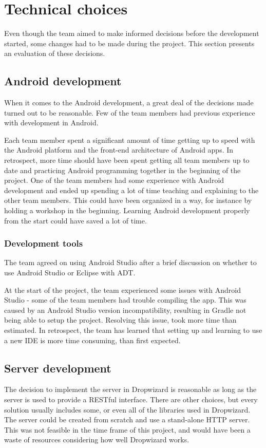 \newpage
\section{Technical choices}
Even though the team aimed to make informed decisions before the development started, some changes had to be made during the project. This section presents an evaluation of these decisions.

\subsection{Android development}
When it comes to the Android development, a great deal of the decisions made turned out to be reasonable. Few of the team members had previous experience with development in Android.

Each team member spent a significant amount of time getting up to speed with the Android platform and the front-end architecture of Android apps. In retrospect, more time should have been spent getting all team members up to date and practicing Android programming together in the beginning of the project. One of the team members had some experience with Android development and ended up spending a lot of time teaching and explaining to the other team members. This could have been organized in a way, for instance by holding a workshop in the beginning. Learning Android development properly from the start could have saved a lot of time.

\subsubsection{Development tools}
The team agreed on using Android Studio after a brief discussion on whether to use Android Studio or Eclipse with ADT.
 
At the start of the project, the team experienced some issues with Android Studio - some of the team members had trouble compiling the app. This was caused by an Android Studio version incompatibility, resulting in Gradle not being able to setup the project. Resolving this issue, took more time than estimated. In retrospect, the team has learned that setting up and learning to use a new IDE is more time consuming, than first expected.

\subsection{Server development}

The decision to implement the server in Dropwizard is reasonable as long as the server is used to provide a RESTful interface. There are other choices, but every solution usually includes some, or even all of the libraries used in Dropwizard. The server could be created from scratch and use a stand-alone HTTP server. This was not feasible in the time frame of this project, and would have been a waste of resources considering how well Dropwizard works.

